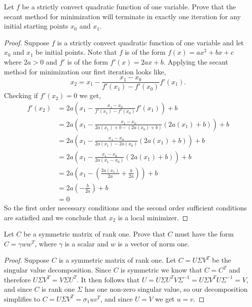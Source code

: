 \documentclass[12pt]{article}
\makeatletter
\theoremstyle{homework}
\newenvironment{exercise}[1]
{\def\@currentlabel{#1}\exercisecore}
{\endexercisecore}
\makeatother
\begin{document}
\begin{exercise}{3.3} Let $f$ be a strictly convect quadratic function of one variable. Prove that the 
  secant method for minimization will terminate in exactly one iteration for any initial starting points
  $x_0$ and $x_1$. 
  \begin{proof} Suppose $f$ is a strictly convect quadratic function of one variable and let $x_0$ and $x_1$ be 
    initial points. Note that $f$ is of the form $f(x) = ax^2 + bx + c$ where $2a > 0$ and $f'$ is of the form 
    $f'(x) = 2ax + b$. Applying the secant method for minimization our first iteration looks like, 
    \begin{equation*}
      x_2 = x_1 - \frac{x_1 - x_0}{f'(x_1) - f'(x_0)}f'(x_1).
    \end{equation*}
    Checking if $f'(x_2) = 0$ we get, 
    \begin{align*}
      f'(x_2) &= 2a \left(x_1 - \frac{x_1 - x_0}{f'(x_1) - f'(x_0)}f'(x_1)\right) + b\\
      &= 2a \left(x_1 - \frac{x_1 - x_0}{2a(x_1) + b - (2a(x_0) + b)}(2a(x_1) + b)\right) + b\\
      &= 2a \left(x_1 - \frac{x_1 - x_0}{2a(x_1) - 2a(x_0)}(2a(x_1) + b)\right) + b\\
      &= 2a \left(x_1 - \frac{x_1 - x_0}{2a(x_1 - x_0)}(2a(x_1) + b)\right) + b\\
      &= 2a \left(x_1 - \left(\frac{2a(x_1)}{2a} + \frac{b}{2a}\right)\right) + b\\
      &= 2a \left(- \frac{b}{2a}\right) + b\\
      &= 0
    \end{align*}
    So the first order necessary conditions and the second order sufficient conditions are satisfied and we conclude that $x_2$ 
    is a local minimizer. 
  \end{proof}
\end{exercise}
\vspace{.5in}

\begin{exercise}{3.4} Let $C$ be a symmetric matrix of rank one. Prove that $C$ must have the form $C = \gamma w w^T$, where 
  $\gamma$ is a scalar and $w$ is a vector of norm one. 
  \begin{proof} Suppose $C$ is a symmetric matrix of rank one. Let $C = U\Sigma V^T$ be the singular value decomposition. Since 
    $C$ is symmetric we know that $C = C^T$ and therefore $U\Sigma V^T = V\Sigma U^T$. It then 
    follows that $U =  U\Sigma U^TV\Sigma^{-1} = U\Sigma V^TU\Sigma^{-1} = V$, and since $C$ is rank one $\Sigma$ has one non-zero 
    singular value, so our decomposition simplifies to $C = U\Sigma V^T = \sigma_1 uv^T$, and since $U = V$ we get $u = v$. 
  \end{proof}
\end{exercise}
\vspace{.5in}
\end{document}
